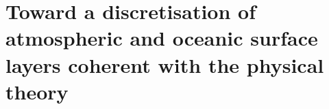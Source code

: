 \chapter{Toward a discretisation of atmospheric and oceanic surface
layers coherent with the physical theory}
\label{ch:ND}
\minitoc




